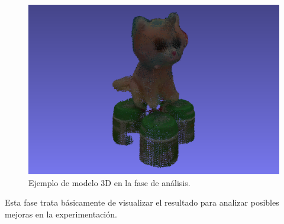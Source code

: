 \begin{figure}[h]
    \centering
    \includegraphics[width=\textwidth]{archivos/analisis-ejemplo-resultado.png}
    \caption{Ejemplo de modelo 3D en la fase de análisis.}
    \label{fig:analisis-ejemplo-resultado}
\end{figure}

Esta fase trata básicamente de visualizar el resultado para analizar posibles mejoras en la experimentación.

